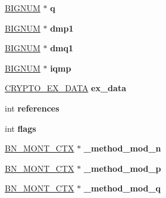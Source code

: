 \begin{DoxyCompactItemize}
\item 
\hypertarget{structrsa__st_a84e322ac5e04068ce455e1962151a260}{}\hyperlink{structbignum__st}{B\+I\+G\+N\+U\+M} $\ast$ {\bfseries q}\label{structrsa__st_a84e322ac5e04068ce455e1962151a260}

\item 
\hypertarget{structrsa__st_ac6f23327027071ef7399f4d72f6c01b7}{}\hyperlink{structbignum__st}{B\+I\+G\+N\+U\+M} $\ast$ {\bfseries dmp1}\label{structrsa__st_ac6f23327027071ef7399f4d72f6c01b7}

\item 
\hypertarget{structrsa__st_afc6066b59b320df8632e9bdc3cce2972}{}\hyperlink{structbignum__st}{B\+I\+G\+N\+U\+M} $\ast$ {\bfseries dmq1}\label{structrsa__st_afc6066b59b320df8632e9bdc3cce2972}

\item 
\hypertarget{structrsa__st_af686fae5b080774028bc3f41370f57e6}{}\hyperlink{structbignum__st}{B\+I\+G\+N\+U\+M} $\ast$ {\bfseries iqmp}\label{structrsa__st_af686fae5b080774028bc3f41370f57e6}

\item 
\hypertarget{structrsa__st_a721c63c63c45f67f572aaa177e2357ad}{}\hyperlink{structcrypto__ex__data__st}{C\+R\+Y\+P\+T\+O\+\_\+\+E\+X\+\_\+\+D\+A\+T\+A} {\bfseries ex\+\_\+data}\label{structrsa__st_a721c63c63c45f67f572aaa177e2357ad}

\item 
\hypertarget{structrsa__st_a3b8d372e797fd47606f57789f1c98df9}{}int {\bfseries references}\label{structrsa__st_a3b8d372e797fd47606f57789f1c98df9}

\item 
\hypertarget{structrsa__st_abf88fc039269dcd478fd4436d4b332ae}{}int {\bfseries flags}\label{structrsa__st_abf88fc039269dcd478fd4436d4b332ae}

\item 
\hypertarget{structrsa__st_a3942c90b1f0b16266528f88d14adc6ca}{}\hyperlink{structbn__mont__ctx__st}{B\+N\+\_\+\+M\+O\+N\+T\+\_\+\+C\+T\+X} $\ast$ {\bfseries \+\_\+method\+\_\+mod\+\_\+n}\label{structrsa__st_a3942c90b1f0b16266528f88d14adc6ca}

\item 
\hypertarget{structrsa__st_a468edd0a44ae2aefed076f99f8714ffd}{}\hyperlink{structbn__mont__ctx__st}{B\+N\+\_\+\+M\+O\+N\+T\+\_\+\+C\+T\+X} $\ast$ {\bfseries \+\_\+method\+\_\+mod\+\_\+p}\label{structrsa__st_a468edd0a44ae2aefed076f99f8714ffd}

\item 
\hypertarget{structrsa__st_a463b97b59664b66f0e29881c915a1489}{}\hyperlink{structbn__mont__ctx__st}{B\+N\+\_\+\+M\+O\+N\+T\+\_\+\+C\+T\+X} $\ast$ {\bfseries \+\_\+method\+\_\+mod\+\_\+q}\label{structrsa__st_a463b97b59664b66f0e29881c915a1489}


\end{DoxyCompactItemize}
